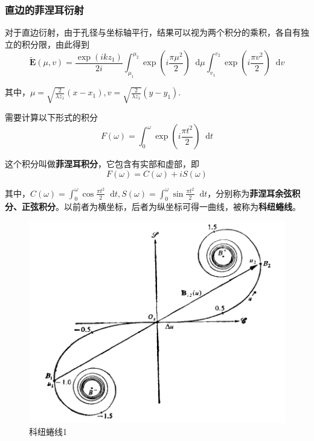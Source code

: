 \documentclass[UTF8]{ctexart}
\newcommand*{\dif}{\mathop{}\!\mathrm{d}}
\begin{document}
	\subsubsection{直边的菲涅耳衍射}
	对于直边衍射，由于孔径与坐标轴平行，结果可以视为两个积分的乘积，各自有独立的积分限，由此得到
	\begin{equation}
		\tilde{\boldsymbol{E}}(\mu, v)= \frac{\exp (i k z_{1})}{2 i} \int_{\mu_{1}}^{\mu_{2}} \exp \left( i \frac{\pi \mu^{2}}{2}\right) \dif \mu \int_{v_{1}}^{v_{2}} \exp \left( i \frac{\pi v^{2}}{2}\right) \dif v
	\end{equation}
	
\noindent 其中，$ \mu = \sqrt{\frac{2}{\lambda z_{1}}} (x-x_{1}), v= \sqrt{\frac{2}{\lambda z_{1}}} (y-y_{1}) $.

	需要计算以下形式的积分
	\begin{equation}
		F(\omega) = \int_{0}^{\omega} \exp \left(i \frac{\pi t^{2}}{2} \right) \dif t
	\end{equation}
	
	这个积分叫做\textbf{菲涅耳积分}，它包含有实部和虚部，即
	\begin{equation}
		F(\omega) = C(\omega) + i S(\omega) \label{equ_Fenier}
	\end{equation}
	
\noindent 其中，$ C(\omega) = \int_{0}^{\omega} \cos \frac{\pi t^{2}}{2} \dif t, S(\omega) = \int_{0}^{\omega} \sin \frac{\pi t^{2}}{2} \dif t $，分别称为\textbf{菲涅耳余弦积分、正弦积分}。以前者为横坐标，后者为纵坐标可得一曲线，被称为\textbf{科纽蜷线}。

\begin{figure}[H]
	\centering
	\includegraphics[width=12cm]{Diffraction_quanxian2.png}
	\caption{科纽蜷线1}
	\label{figure_quanxian1}
\end{figure}
\end{document}
